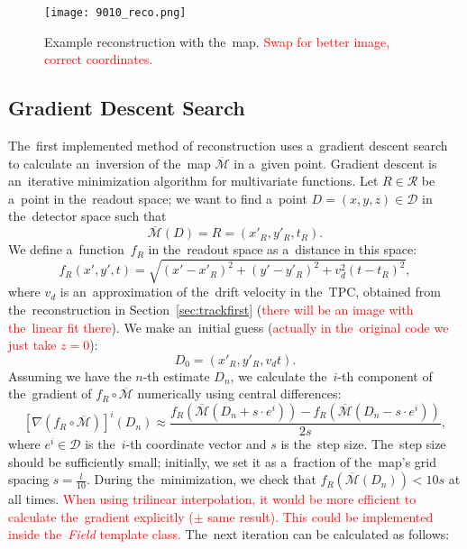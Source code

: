 		\begin{figure}[H]
			\centering
			\texttt{[image: 9010\_reco.png]}
			\caption{Example reconstruction with the~map. \textcolor{red}{Swap for better image, correct coordinates.}}
			\label{fig:9010reco}
		\end{figure}
		
		\subsection{Gradient Descent Search}
		\label{sec:grad}			
			The~first implemented method of reconstruction uses a~gradient descent search to calculate an~inversion of the~map $\overbar{\mathcal{M}}$ in a~given point. Gradient descent is an~iterative minimization algorithm for multivariate functions. Let $R\in\mathcal{R}$ be a~point in the~readout space; we want to find a~point $D = (x,y,z) \in\mathcal{D}$ in the~detector space such that 
				\begin{equation}
					\overbar{\mathcal{M}}(D) = R = (x'_R,y'_R,t_R).
				\end{equation}
			We define a~function~$f_R$ in the~readout space as a~distance in this space:
				\begin{equation}
					f_R(x',y',t) = \sqrt{(x'-x'_R)^2+(y'-y'_R)^2+v_d^2(t-t_R)^2},
				\end{equation}
			where $v_d$ is an~approximation of the~drift velocity in the~\ac{TPC}, obtained from the~reconstruction in Section~\ref{sec:trackfirst} (\textcolor{red}{there will be an image with the~linear fit there}). We make an~initial guess (\textcolor{red}{actually in the~original code we just take $z=0$}):
				\begin{equation}
					D_0 = (x'_R,y'_R,v_dt).
				\end{equation}
			Assuming we have the $n$-th estimate $D_n$, we calculate the~$i$-th component of the~gradient of $f_R\circ\overbar{\mathcal{M}}$ numerically using central differences:
				\begin{equation}
					\left[\nabla(f_R\circ\overbar{\mathcal{M}})\right]^i(D_n) \approx \frac{f_R(\overbar{\mathcal{M}}(D_n+s\cdot e^i))-f_R(\overbar{\mathcal{M}}(D_n-s\cdot e^i))}{2s},
				\end{equation}
			where $e^i\in\mathcal{D}$ is the~$i$-th coordinate vector and $s$ is the~step size. The~step size should be sufficiently small; initially, we set it as a~fraction of the~map's grid spacing $s = \frac{l}{10}$. During the~minimization, we check that $f_R(\overbar{\mathcal{M}}(D_n))<10s$ at all times. \textcolor{red}{When using trilinear interpolation, it would be more efficient to calculate the~gradient explicitly ($\pm$ same result). This could be implemented inside the~\textit{Field} template class.} The~next iteration can be calculated as follows:
